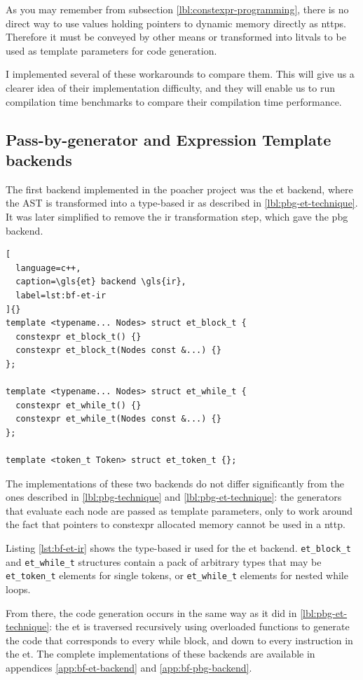 \documentclass[../main]{subfiles}
\begin{document}
As you may remember from subsection \ref{lbl:constexpr-programming},
there is no direct way to use values holding pointers to dynamic memory
directly as \glspl{nttp}.
Therefore it must be conveyed by other means or transformed into \glspl{litval}
to be used as template parameters for \cpp code generation.

I implemented several of these workarounds to compare them.
This will give us a clearer idea of their implementation difficulty,
and they will enable us to run compilation time benchmarks to compare their
compilation time performance.

\subsection{
  Pass-by-generator and Expression Template backends
}

The first backend implemented in the poacher project was the \gls{et} backend,
where the AST is transformed into a type-based \gls{ir}
as described in \ref{lbl:pbg-et-technique}. It was later simplified to
remove the \gls{ir} transformation step, which gave the \gls{pbg} backend.

\begin{lstlisting}[
  language=c++,
  caption=\gls{et} backend \gls{ir},
  label=lst:bf-et-ir
]{}
template <typename... Nodes> struct et_block_t {
  constexpr et_block_t() {}
  constexpr et_block_t(Nodes const &...) {}
};

template <typename... Nodes> struct et_while_t {
  constexpr et_while_t() {}
  constexpr et_while_t(Nodes const &...) {}
};

template <token_t Token> struct et_token_t {};
\end{lstlisting}

The implementations of these two backends do not differ significantly from
the ones described in \ref{lbl:pbg-technique} and \ref{lbl:pbg-et-technique}:
the generators that evaluate each node are passed as template parameters,
only to work around the fact that pointers to \gls{constexpr} allocated memory
cannot be used in a \gls{nttp}.

Listing \ref{lst:bf-et-ir} shows the type-based \gls{ir} used for the \gls{et}
backend. \lstinline{et_block_t} and \lstinline{et_while_t} structures contain a
pack of arbitrary types that may be \lstinline{et_token_t} elements for single
tokens, or \lstinline{et_while_t} elements for nested while loops.

From there, the code generation occurs in the same way as it did in
\ref{lbl:pbg-et-technique}: the \gls{et} is traversed recursively using
overloaded functions to generate the \cpp code that corresponds to every
while block, and down to every instruction in the \gls{et}.
The complete implementations of these backends are available in appendices
\ref{app:bf-et-backend} and \ref{app:bf-pbg-backend}.
\end{document}
